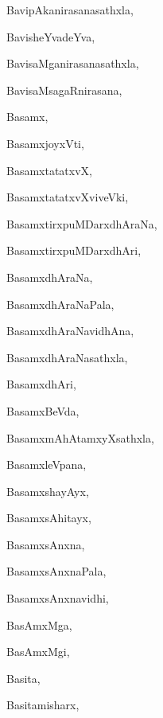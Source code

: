 \begin{multicols}{3}
{\noindent
{BavipAkanirasanasathxla}, \pageref{BavipAkanirasanasathxla}

\noindent
{BavisheYvadeYva}, \pageref{BavisheYvadeYva}

\noindent
{BavisaMganirasanasathxla}, \pageref{BavisaMganirasanasathxla}

\noindent
{BavisaMsagaRnirasana}, \pageref{BavisaMsagaRnirasana}

\noindent
{Basamx}, \pageref{Basamx}

\noindent
{BasamxjoyxVti}, \pageref{BasamxjoyxVti}

\noindent
{BasamxtatatxvX}, \pageref{BasamxtatatxvX}

\noindent
{BasamxtatatxvXviveVki}, \pageref{BasamxtatatxvXviveVki}

\noindent
{BasamxtirxpuMDarxdhAraNa}, \pageref{BasamxtirxpuMDarxdhAraNa}

\noindent
{BasamxtirxpuMDarxdhAri}, \pageref{BasamxtirxpuMDarxdhAri}

\noindent
{BasamxdhAraNa}, \pageref{BasamxdhAraNa}

\noindent
{BasamxdhAraNaPala}, \pageref{BasamxdhAraNaPala}

\noindent
{BasamxdhAraNavidhAna}, \pageref{BasamxdhAraNavidhAna}

\noindent
{BasamxdhAraNasathxla}, \pageref{BasamxdhAraNasathxla}

\noindent
{BasamxdhAri}, \pageref{BasamxdhAri}

\noindent
{BasamxBeVda}, \pageref{BasamxBeVda}

\noindent
{BasamxmAhAtamxyXsathxla}, \pageref{BasamxmAhAtamxyXsathxla}

\noindent
{BasamxleVpana}, \pageref{BasamxleVpana}

\noindent
{BasamxshayAyx}, \pageref{BasamxshayAyx}

\noindent
{BasamxsAhitayx}, \pageref{BasamxsAhitayx}

\noindent
{BasamxsAnxna}, \pageref{BasamxsAnxna}

\noindent
{BasamxsAnxnaPala}, \pageref{BasamxsAnxnaPala}

\noindent
{BasamxsAnxnavidhi}, \pageref{BasamxsAnxnavidhi}

\noindent
{BasAmxMga}, \pageref{BasAmxMga}

\noindent
{BasAmxMgi}, \pageref{BasAmxMgi}

\noindent
{Basita}, \pageref{Basita}

\noindent
{Basitamisharx}, \pageref{Basitamisharx}

}
\end{multicols}
